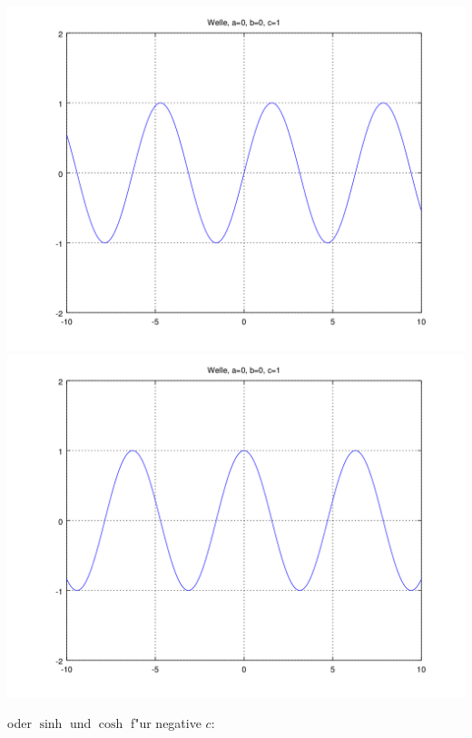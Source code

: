 \noindent
\includegraphics[scale=0.35]{./wellen/images/basicfunctions/sin.png}
\includegraphics[scale=0.35]{./wellen/images/basicfunctions/cos.png}

oder $\sinh$ und $\cosh$ f"ur negative $c$:

